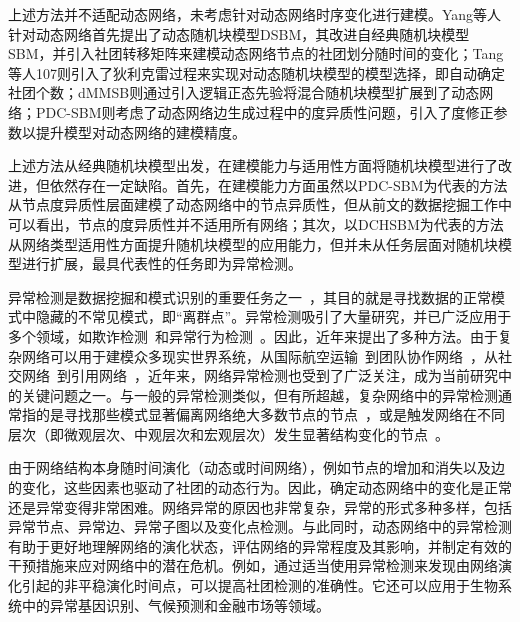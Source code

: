 上述方法并不适配动态网络，未考虑针对动态网络时序变化进行建模。Yang等人针对动态网络首先提出了动态随机块模型DSBM\cite{yang2011detecting}，其改进自经典随机块模型SBM，并引入社团转移矩阵来建模动态网络节点的社团划分随时间的变化；Tang等人107则引入了狄利克雷过程来实现对动态随机块模型的模型选择，即自动确定社团个数；dMMSB\cite{xing2010state}则通过引入逻辑正态先验将混合随机块模型扩展到了动态网络；PDC-SBM\cite{riverain2023poisson}则考虑了动态网络边生成过程中的度异质性问题，引入了度修正参数以提升模型对动态网络的建模精度。

上述方法从经典随机块模型出发，在建模能力与适用性方面将随机块模型进行了改进，但依然存在一定缺陷。首先，在建模能力方面虽然以PDC-SBM为代表的方法从节点度异质性层面建模了动态网络中的节点异质性，但从前文的数据挖掘工作中可以看出，节点的度异质性并不适用所有网络；其次，以DCHSBM为代表的方法从网络类型适用性方面提升随机块模型的应用能力，但并未从任务层面对随机块模型进行扩展，最具代表性的任务即为异常检测。


异常检测是数据挖掘和模式识别的重要任务之一~\cite{chandola2009anomaly,zenati2018adversarially}，其目的就是寻找数据的正常模式中隐藏的不常见模式，即“离群点”。异常检测吸引了大量研究，并已广泛应用于多个领域，如欺诈检测~\cite{ahmed2016survey}和异常行为检测~\cite{amraee2018anomaly}。因此，近年来提出了多种方法。由于复杂网络可以用于建模众多现实世界系统，从国际航空运输~\cite{kasai2016network}到团队协作网络~\cite{zhou2019towards}，从社交网络~\cite{lv2017social}到引用网络~\cite{ley2002dblp}，近年来，网络异常检测也受到了广泛关注，成为当前研究中的关键问题之一。与一般的异常检测类似，但有所超越，复杂网络中的异常检测通常指的是寻找那些模式显著偏离网络绝大多数节点的节点~\cite{ding2019interactive,ding2020inductive}，或是触发网络在不同层次（即微观层次、中观层次和宏观层次）发生显著结构变化的节点~\cite{ranshous2015anomaly}。



由于网络结构本身随时间演化（动态或时间网络）\cite{huang2015triadic}，例如节点的增加和消失以及边的变化，这些因素也驱动了社团的动态行为。因此，确定动态网络中的变化是正常还是异常变得非常困难。网络异常的原因也非常复杂，异常的形式多种多样，包括异常节点、异常边、异常子图以及变化点检测\cite{ranshous2015anomaly}。与此同时，动态网络中的异常检测有助于更好地理解网络的演化状态，评估网络的异常程度及其影响，并制定有效的干预措施来应对网络中的潜在危机。例如，通过适当使用异常检测来发现由网络演化引起的非平稳演化时间点，可以提高社团检测的准确性。它还可以应用于生物系统中的异常基因识别、气候预测和金融市场等领域。

